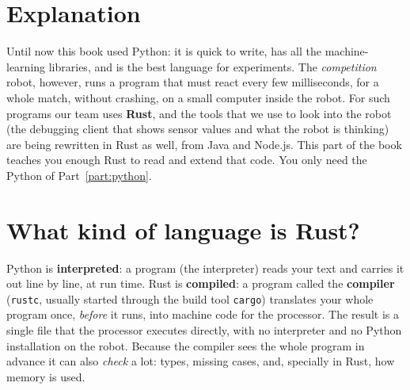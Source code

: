 \label{ch:rust1}

\section*{Explanation}
Until now this book used Python: it is quick to write, has all the machine-learning libraries, and is the best language for experiments. The \emph{competition} robot, however, runs a program that must react every few milliseconds, for a whole match, without crashing, on a small computer inside the robot. For such programs our team uses \textbf{Rust}, and the tools that we use to look into the robot (the debugging client that shows sensor values and what the robot is thinking) are being rewritten in Rust as well, from Java and Node.js. This part of the book teaches you enough Rust to read and extend that code. You only need the Python of Part~\ref{part:python}.

\section*{What kind of language is Rust?}
Python is \textbf{interpreted}: a program (the interpreter) reads your text and carries it out line by line, at run time. Rust is \textbf{compiled}: a program called the \textbf{compiler} (\verb!rustc!, usually started through the build tool \verb!cargo!) translates your whole program once, \emph{before} it runs, into machine code for the processor. The result is a single file that the processor executes directly, with no interpreter and no Python installation on the robot. Because the compiler sees the whole program in advance it can also \emph{check} a lot: types, missing cases, and, specially in Rust, how memory is used.
\begin{center}
\end{center}

